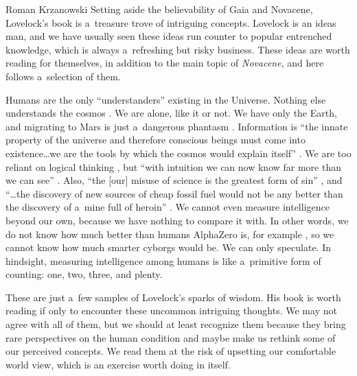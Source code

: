 \begin{newrevengenv}{Roman Krzanowski}
Setting aside the believability of Gaia and Novacene, Lovelock's book is a~treasure trove of intriguing concepts. Lovelock is an ideas man, and we have usually seen these ideas run counter to popular entrenched knowledge, which is always a~refreshing but risky business. These ideas are worth reading for themselves, in addition to the main topic of \textit{Novacene}, and here follows a~selection of them.

Humans are the only ``understanders'' existing in the Universe. Nothing else understands the cosmos
\parencite*[][p.3]{lovelock_novacene_2019}. %
 We are alone, like it or not. We have only the Earth, and migrating to Mars is just a~dangerous phantasm 
\parencite*[][pp.8–9]{lovelock_novacene_2019}. %
 Information is ``the innate property of the universe and therefore conscious beings must come into existence…we are the tools by which the cosmos would explain itself'' 
\parencite*[][p.26]{lovelock_novacene_2019}. %
 We are too reliant on logical thinking 
\parencite*[][p.13]{lovelock_novacene_2019}, %
 but ``with intuition we can now know far more than we can see'' 
\parencite*[][p.22]{lovelock_novacene_2019}. %
 Also, ``the [our] misuse of science is the greatest form of sin'' 
\parencite*[][p.49]{lovelock_novacene_2019}, %
 and ``…the discovery of new sources of cheap fossil fuel would not be any better than the discovery of a~mine full of heroin'' 
\parencite*[][p.49]{lovelock_novacene_2019}. %
 We cannot even measure intelligence beyond our own, because we have nothing to compare it with. In other words, we do not know how much better than humans AlphaZero is, for example 
\parencite*[][p.80]{lovelock_novacene_2019}, %
 so we cannot know how much smarter cyborgs would be. We can only speculate. In hindsight, measuring intelligence among humans is like a~primitive form of counting: one, two, three, and plenty.

These are just a~few samples of Lovelock's sparks of wisdom. His book is worth reading if only to encounter these uncommon intriguing thoughts. We may not agree with all of them, but we should at least recognize them because they bring rare perspectives on the human condition and maybe make us rethink some of our perceived concepts. We read them at the risk of upsetting our comfortable world view, which is an exercise worth doing in itself.


\end{newrevengenv}
